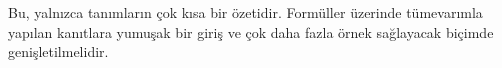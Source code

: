 \documentclass[../../../include/open-logic-chapter]{subfiles}
\begin{document}

\begin{editorial}
  Bu, yalnızca tanımların çok kısa bir özetidir. Formüller üzerinde
  tümevarımla yapılan kanıtlara yumuşak bir giriş ve çok daha fazla örnek
  sağlayacak biçimde genişletilmelidir.
\end{editorial}







\OLEndChapterHook
\end{document}
